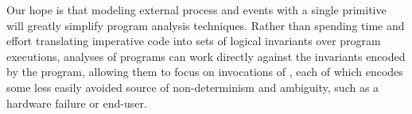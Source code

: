 Our hope is that modeling external process and events with a single
primitive will greatly simplify program analysis techniques.  Rather
than spending time and effort translating imperative code into sets of logical
invariants over program executions, analyses of \lang programs can
work directly against the invariants encoded by the program, allowing
them to focus on invocations of , each of which
encodes some less easily avoided source of non-determinism and
ambiguity, such as a hardware failure or end-user.

